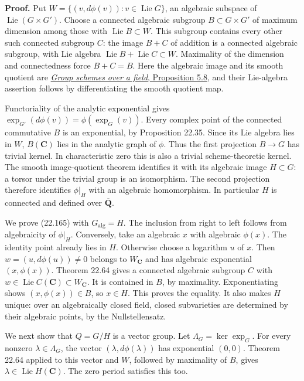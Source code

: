 \documentclass[
  11pt,
  a4paper,
]{article}
\begin{document}
\textbf{Proof.} Put \(W=\{(v,d\phi(v)):v\in\operatorname{Lie}G\}\), an
algebraic subspace of \(\operatorname{Lie}(G\times G')\). Choose a
connected algebraic subgroup \(B\subset G\times G'\) of maximum
dimension among those with \(\operatorname{Lie}B\subset W\). This
subgroup contains every other such connected subgroup \(C\): the image
\(B+C\) of addition is a connected algebraic subgroup, with Lie algebra
\(\operatorname{Lie}B+\operatorname{Lie}C\subset W\). Maximality of the
dimension and connectedness force \(B+C=B\). Here the algebraic image
and its smooth quotient are
\href{https://kokunoyumeto.github.io/open-math-courses-public/courses/AG-GS/AG-GS-03.html\#5-closed-subgroups-centrality-and-a-manageable-open-subgroup}{\emph{Group
schemes over a field}, Proposition 5.8}, and their Lie-algebra assertion
follows by differentiating the smooth quotient map.

Functoriality of the analytic exponential gives
\(\exp_{G'}(d\phi(v))=\phi(\exp_G(v))\). Every complex point of the
connected commutative \(B\) is an exponential, by Proposition 22.35.
Since its Lie algebra lies in \(W\), \(B(\mathbf C)\) lies in the
analytic graph of \(\phi\). Thus the first projection \(B\to G\) has
trivial kernel. In characteristic zero this is also a trivial
scheme-theoretic kernel. The smooth image-quotient theorem identifies it
with its algebraic image \(H\subset G\): a torsor under the trivial
group is an isomorphism. The second projection therefore identifies
\(\phi|_H\) with an algebraic homomorphism. In particular \(H\) is
connected and defined over \(\overline{\mathbf Q}\).

We prove (22.165) with \(G_{\mathrm{alg}}=H\). The inclusion from right
to left follows from algebraicity of \(\phi|_H\). Conversely, take an
algebraic \(x\) with algebraic \(\phi(x)\). The identity point already
lies in \(H\). Otherwise choose a logarithm \(u\) of \(x\). Then
\(w=(u,d\phi(u))\ne0\) belongs to \(W_{\mathbf C}\) and has algebraic
exponential \((x,\phi(x))\). Theorem 22.64 gives a connected algebraic
subgroup \(C\) with
\(w\in\operatorname{Lie}C(\mathbf C)\subset W_{\mathbf C}\). It is
contained in \(B\), by maximality. Exponentiating shows
\((x,\phi(x))\in B\), so \(x\in H\). This proves the equality. It also
makes \(H\) unique: over an algebraically closed field, closed
subvarieties are determined by their algebraic points, by the
Nullstellensatz.

We next show that \(Q=G/H\) is a vector group. Let
\(\Lambda_G=\ker\exp_G\). For every nonzero \(\lambda\in\Lambda_G\), the
vector \((\lambda,d\phi(\lambda))\) has exponential \((0,0)\). Theorem
22.64 applied to this vector and \(W\), followed by maximality of \(B\),
gives \(\lambda\in\operatorname{Lie}H(\mathbf C)\). The zero period
satisfies this too.
\end{document}
